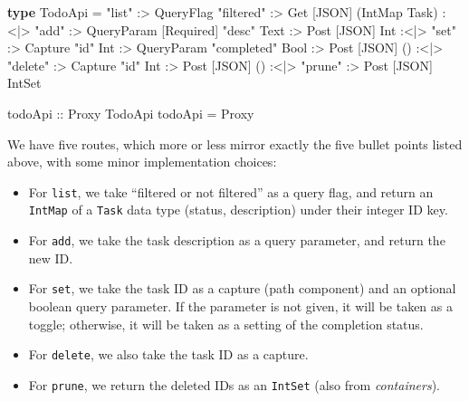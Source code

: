 \documentclass[]{article}
\newenvironment{Shaded}{}{}
\newcommand{\DataTypeTok}[1]{\textcolor[rgb]{0.56,0.13,0.00}{#1}}
\newcommand{\KeywordTok}[1]{\textcolor[rgb]{0.00,0.44,0.13}{\textbf{#1}}}
\newcommand{\NormalTok}[1]{#1}
\newcommand{\OperatorTok}[1]{\textcolor[rgb]{0.40,0.40,0.40}{#1}}
\newcommand{\OtherTok}[1]{\textcolor[rgb]{0.00,0.44,0.13}{#1}}
\newcommand{\StringTok}[1]{\textcolor[rgb]{0.25,0.44,0.63}{#1}}
\begin{document}
\begin{Shaded}
\begin{Highlighting}[]
\KeywordTok{type} \DataTypeTok{TodoApi} \OtherTok{=} \StringTok{"list"}   \OperatorTok{:>} \DataTypeTok{QueryFlag} \StringTok{"filtered"}
                        \OperatorTok{:>} \DataTypeTok{Get}\NormalTok{  \textquotesingle{}[}\DataTypeTok{JSON}\NormalTok{] (}\DataTypeTok{IntMap} \DataTypeTok{Task}\NormalTok{)}
          \OperatorTok{:<|>} \StringTok{"add"}    \OperatorTok{:>} \DataTypeTok{QueryParam\textquotesingle{}}\NormalTok{ \textquotesingle{}[}\DataTypeTok{Required}\NormalTok{] }\StringTok{"desc"} \DataTypeTok{Text}
                        \OperatorTok{:>} \DataTypeTok{Post}\NormalTok{ \textquotesingle{}[}\DataTypeTok{JSON}\NormalTok{] }\DataTypeTok{Int}
          \OperatorTok{:<|>} \StringTok{"set"}    \OperatorTok{:>} \DataTypeTok{Capture} \StringTok{"id"} \DataTypeTok{Int}
                        \OperatorTok{:>} \DataTypeTok{QueryParam} \StringTok{"completed"} \DataTypeTok{Bool}
                        \OperatorTok{:>} \DataTypeTok{Post}\NormalTok{ \textquotesingle{}[}\DataTypeTok{JSON}\NormalTok{] ()}
          \OperatorTok{:<|>} \StringTok{"delete"} \OperatorTok{:>} \DataTypeTok{Capture} \StringTok{"id"} \DataTypeTok{Int}
                        \OperatorTok{:>} \DataTypeTok{Post}\NormalTok{ \textquotesingle{}[}\DataTypeTok{JSON}\NormalTok{] ()}
          \OperatorTok{:<|>} \StringTok{"prune"}  \OperatorTok{:>} \DataTypeTok{Post}\NormalTok{ \textquotesingle{}[}\DataTypeTok{JSON}\NormalTok{] }\DataTypeTok{IntSet}

\OtherTok{todoApi ::} \DataTypeTok{Proxy} \DataTypeTok{TodoApi}
\NormalTok{todoApi }\OtherTok{=} \DataTypeTok{Proxy}
\end{Highlighting}
\end{Shaded}

We have five routes, which more or less mirror exactly the five bullet points
listed above, with some minor implementation choices:

\begin{itemize}
\tightlist
\item
  For \texttt{list}, we take ``filtered or not filtered'' as a query flag, and
  return an \texttt{IntMap} of a \texttt{Task} data type (status, description)
  under their integer ID key.
\item
  For \texttt{add}, we take the task description as a query parameter, and
  return the new ID.
\item
  For \texttt{set}, we take the task ID as a capture (path component) and an
  optional boolean query parameter. If the parameter is not given, it will be
  taken as a toggle; otherwise, it will be taken as a setting of the completion
  status.
\item
  For \texttt{delete}, we also take the task ID as a capture.
\item
  For \texttt{prune}, we return the deleted IDs as an \texttt{IntSet} (also from
  \emph{containers}).
\end{itemize}
\end{document}
